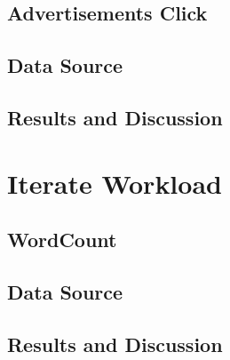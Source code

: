\subsection{Advertisements Click}
\subsection{Data Source}
\subsection{Results and Discussion}

\section{Iterate Workload}
\subsection{WordCount}
\subsection{Data Source}
\subsection{Results and Discussion}

\clearpage
